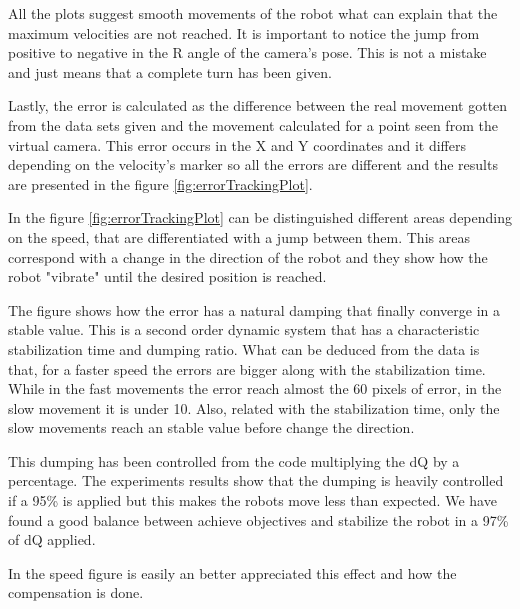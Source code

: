 	All the plots suggest smooth movements of the robot what can explain that the maximum velocities are not reached. It is important to notice the jump from positive to negative in the R angle of the camera's pose. This is not a mistake and just means that a complete turn has been given.

	Lastly, the error is calculated as the difference between the real movement gotten from the data sets given and the movement calculated for a point seen from the virtual camera.
	This error occurs in the X and Y coordinates and it differs depending on the velocity's marker so all the errors are different and the results are presented in the figure \ref{fig:errorTrackingPlot}.

		\ifx \plots \yes
			\errorTrackingPlot
		\fi
		
	In the figure \ref{fig:errorTrackingPlot} can be distinguished different areas depending on the speed, that are differentiated with a jump between them. 
	This areas correspond with a change in the direction of the robot and they show how the robot "vibrate" until the desired position is reached.

	The figure shows how the error has a natural damping that finally converge in a stable value. This is a second order dynamic system that has a characteristic stabilization time and dumping ratio. What can be deduced from the data is that, for a faster speed the errors are bigger along with the stabilization time. While in the fast movements the error reach almost the 60 pixels of error, in the slow movement it is under 10. Also, related with the stabilization time, only the slow movements reach an stable value before change the direction.

	This dumping has been controlled from the code multiplying the dQ by a percentage. The experiments results show that the dumping is heavily controlled if a 95\% is applied but this makes the robots move less than expected. We have found a good balance between achieve objectives and stabilize the robot in a 97\% of dQ applied.

	In the speed figure is easily an better appreciated this effect and how the compensation is done.

